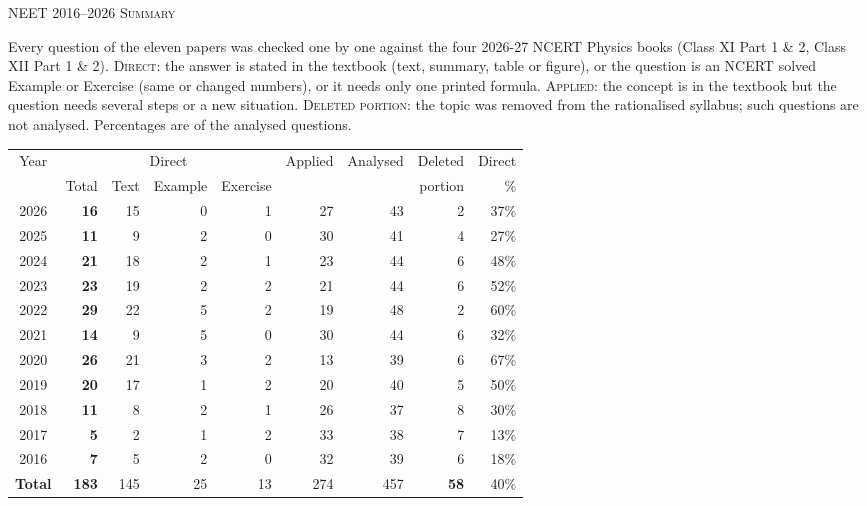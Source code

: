 \clearpage\gdef\curyear{2016--2026 \textperiodcentered{} Summary}
\begin{center}{}\par
{\fontsize{20}{24}\selectfont\color{navy}\scshape NEET 2016--2026 \textperiodcentered{} Summary}\par
{\color{gilt}}\end{center}\label{psummary}
\vspace{6pt}
{\small Every question of the eleven papers was checked one by one against the four 2026-27 NCERT Physics books (Class XI Part 1 \& 2, Class XII Part 1 \& 2). \textsc{Direct}: the answer is stated in the textbook (text, summary, table or figure), or the question is an NCERT solved Example or Exercise (same or changed numbers), or it needs only one printed formula. \textsc{Applied}: the concept is in the textbook but the question needs several steps or a new situation. \textsc{Deleted portion}: the topic was removed from the rationalised syllabus; such questions are not analysed. Percentages are of the analysed questions.}\par\medskip
\begin{center}\small
\begin{tabular}{@{}crrrrrrrr@{}}\toprule
Year & \multicolumn{4}{c}{Direct} & Applied & Analysed & Deleted & Direct\\
\cmidrule(lr){2-5}
 & Total & Text & Example & Exercise & & & portion & \%\\\midrule

2026 & \textbf{16} & 15 & 0 & 1 & 27 & 43 & 2 & 37\%\\
2025 & \textbf{11} & 9 & 2 & 0 & 30 & 41 & 4 & 27\%\\
2024 & \textbf{21} & 18 & 2 & 1 & 23 & 44 & 6 & 48\%\\
2023 & \textbf{23} & 19 & 2 & 2 & 21 & 44 & 6 & 52\%\\
2022 & \textbf{29} & 22 & 5 & 2 & 19 & 48 & 2 & 60\%\\
2021 & \textbf{14} & 9 & 5 & 0 & 30 & 44 & 6 & 32\%\\
2020 & \textbf{26} & 21 & 3 & 2 & 13 & 39 & 6 & 67\%\\
2019 & \textbf{20} & 17 & 1 & 2 & 20 & 40 & 5 & 50\%\\
2018 & \textbf{11} & 8 & 2 & 1 & 26 & 37 & 8 & 30\%\\
2017 & \textbf{5} & 2 & 1 & 2 & 33 & 38 & 7 & 13\%\\
2016 & \textbf{7} & 5 & 2 & 0 & 32 & 39 & 6 & 18\%\\
\midrule\textbf{Total} & \textbf{183} & 145 & 25 & 13 & 274 & 457 & \textbf{58} & 40\%\\\bottomrule
\end{tabular}\end{center}\medskip
